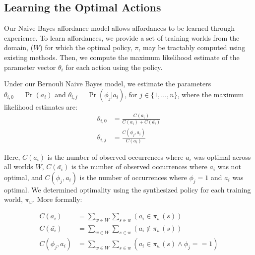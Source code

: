 \documentclass[letterpaper]{article}
\begin{document}


\subsection{Learning the Optimal Actions}
Our Naive Bayes affordance model allows
affordances to be learned through experience.  To learn affordances,
we provide a set of training worlds from the domain, ($W$) for which
the optimal policy, $\pi$, may be tractably computed using existing
methods. Then, we compute the maximum likelihood estimate of the
parameter vector $\theta_i$ for each action using the policy.

Under our Bernouli Naive Bayes model, we estimate the parameters
$\theta_{i,0} = \Pr(a_i)$ and $\theta_{i,j} = \Pr(\phi_j | a_i)$, for $j \in \{1, \ldots, n \}$, where the maximum likelihood estimates are:
\begin{align}
\theta_{i,0} &= \frac{C(a_i)}{C(a_i) + C(\bar{a_i})} \\
\theta_{i,j} &= \frac{C(\phi_j, a_i)}{C(a_i)}
\end{align}

Here, $C(a_i)$ is the number of observed occurrences where $a_i$ was optimal across all worlds $W$,
$C(\bar{a_i})$ is the number of observed occurrences where $a_i$ was not optimal,
and $C(\phi_j, a_i)$ is the number of occurrences where $\phi_j=1$ and $a_i$ was optimal.
We determined optimality using the synthesized policy for each training world, $\pi_w$. More formally:

\begin{align}
C(a_i) &= \sum_{w \in W} \sum_{s \in w} (a_i \in \pi_w(s)) \\
C(\bar{a_i}) &= \sum_{w \in W} \sum_{s \in w} (a_i \not \in \pi_w(s) ) \\
C(\phi_j, a_i) &= \sum_{w \in W} \sum_{s \in w} (a_i  \in \pi_w(s) \wedge \phi_j == 1)
\end{align}
\end{document}
